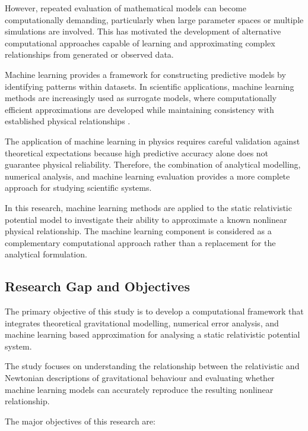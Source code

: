 \documentclass[
]{article}
\begin{document}
However, repeated evaluation of mathematical models can become
computationally demanding, particularly when large parameter spaces or
multiple simulations are involved. This has motivated the development of
alternative computational approaches capable of learning and
approximating complex relationships from generated or observed data.

Machine learning provides a framework for constructing predictive models
by identifying patterns within datasets. In scientific applications,
machine learning methods are increasingly used as surrogate models,
where computationally efficient approximations are developed while
maintaining consistency with established physical relationships
\cite{bishop2006, hastie2009}.

The application of machine learning in physics requires careful
validation against theoretical expectations because high predictive
accuracy alone does not guarantee physical reliability. Therefore, the
combination of analytical modelling, numerical analysis, and machine
learning evaluation provides a more complete approach for studying
scientific systems.

In this research, machine learning methods are applied to the static
relativistic potential model to investigate their ability to approximate
a known nonlinear physical relationship. The machine learning component
is considered as a complementary computational approach rather than a
replacement for the analytical formulation.

\subsection{Research Gap and Objectives}\label{Research-Gap-and-Objectives}

The primary objective of this study is to develop a computational
framework that integrates theoretical gravitational modelling, numerical
error analysis, and machine learning based approximation for analysing a
static relativistic potential system.

The study focuses on understanding the relationship between the
relativistic and Newtonian descriptions of gravitational behaviour and
evaluating whether machine learning models can accurately reproduce the
resulting nonlinear relationship.

The major objectives of this research are:
\end{document}
